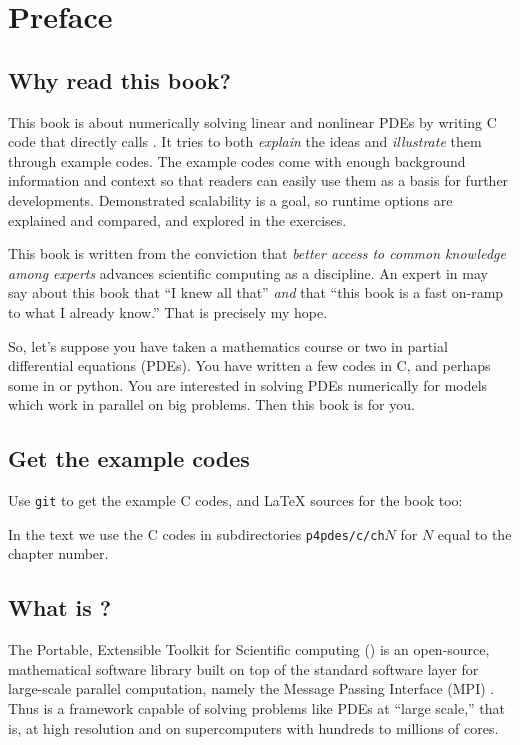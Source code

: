 \chapter*{Preface}

\section{Why read this book?}

This book is about numerically solving linear and nonlinear PDEs by writing C code that directly calls \PETSc.  It tries to both \emph{explain} the ideas and \emph{illustrate} them through example codes.  The example codes come with enough background information and context so that readers can easily use them as a basis for further developments.  Demonstrated scalability is a goal, so runtime options are explained and compared, and explored in the exercises.

This book is written from the conviction that \emph{better access to common knowledge among experts} advances scientific computing as a discipline.  An expert in \PETSc may say about this book that ``I knew all that'' \emph{and} that ``this book is a fast on-ramp to what I already know.''  That is precisely my hope.

So, let's suppose you have taken a mathematics course or two in partial differential equations (PDEs).  You have written a few codes in C,\cite{KernighanRitchie1988} and perhaps some in \Matlab or python.  You are interested in solving PDEs numerically for models which work in parallel on big problems.  Then this book is for you.

\section{Get the example codes}

Use \texttt{git} to get the example C codes, and \LaTeX\xspace sources for the book too:
In the text we use the C codes in subdirectories \texttt{p4pdes/c/ch}$N$ for $N$ equal to the chapter number.

\section{What is \PETSc?}

The Portable, Extensible Toolkit for Scientific computing (\PETSc) is an open-source, mathematical software library built on top of the standard software layer for large-scale parallel computation, namely the Message Passing Interface (MPI) \citep{Groppetal1999}.  Thus \PETSc is a framework capable of solving problems like PDEs at ``large scale,'' that is, at high resolution and on supercomputers with hundreds to millions of cores.

